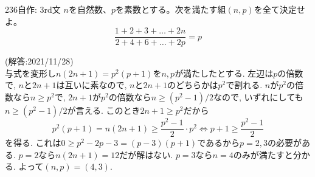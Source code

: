 \begin{prob}{236}{}{自作: 3rd文}
 $n$を自然数、$p$を素数とする。次を満たす組$(n,p)$を全て決定せよ。\\
 \[ \frac{1+2+3+\dots+2n}{2+4+6+\dots+2p}=p \]
\end{prob}
(解答:2021/11/28) \\
与式を変形し$n(2n+1) = p^2(p+1)$を$n,p$が満たしたとする. 左辺は$p$の倍数で, $n$と$2n+1$は互いに素なので, $n$と$2n+1$のどちらかは$p^2$で割れる. $n$が$p^2$の倍数なら$n\geq p^2$で, $2n+1$が$p^2$の倍数なら$n\geq (p^2-1)/2$なので, いずれにしても$n\geq (p^2-1)/2$が言える. このとき$2n+1 \geq p^2$だから
\[p^2(p+1) = n(2n+1) \geq \dfrac{p^2-1}{2}\cdot p^2 \iff p+1\geq \dfrac{p^2-1}{2}\]
を得る. これは$0\geq p^2 - 2p -3 = (p-3)(p+1)$であるから$p=2,3$の必要がある. $p=2$なら$n(2n+1) = 12$だが解はない. $p=3$なら$n=4$のみが満たすと分かる. よって$(n,p) = (4,3)$. 